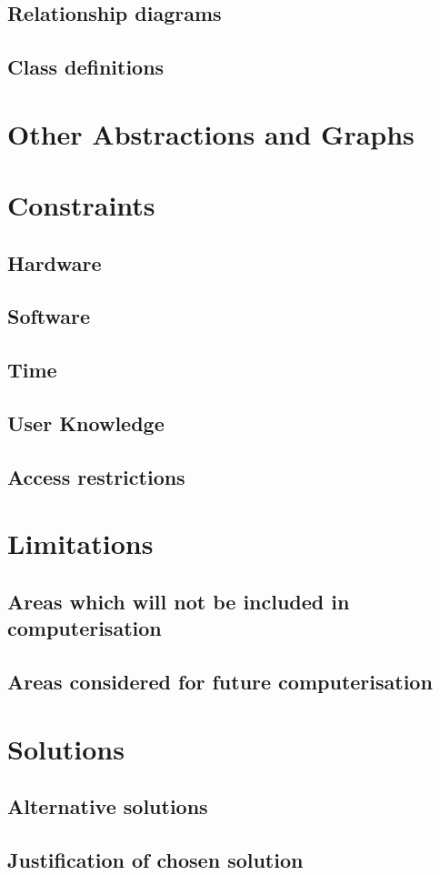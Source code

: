 \subsection{Relationship diagrams}

\subsection{Class definitions}

\section{Other Abstractions and Graphs}

\section{Constraints}

\subsection{Hardware}

\subsection{Software}

\subsection{Time}

\subsection{User Knowledge}

\subsection{Access restrictions}

\section{Limitations}

\subsection{Areas which will not be included in computerisation}

\subsection{Areas considered for future computerisation}

\section{Solutions}

\subsection{Alternative solutions}

\subsection{Justification of chosen solution}